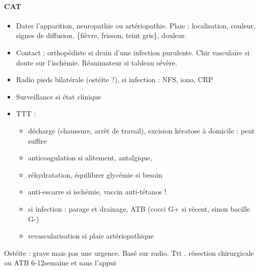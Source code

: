 \documentclass[11pt]{article}
\begin{document}
\paragraph{CAT}
\label{sec:org5c0f980}
\begin{itemize}
\item Dater l'apparition, neuropathie ou artériopathie. Plaie : localisation, couleur,
signes de diffusion, \{fièvre, frisson, teint gris\}, douleur.
\item Contact : orthopédiste si drain d'une infection purulente. Chir vasculaire si
doute sur l'ischémie. Réanimateur si tableau sévère.
\item Radio pieds bilatérale (ostéite ?), si infection : NFS, iono, CRP
\item Surveillance si état clinique
\item TTT : 
\begin{itemize}
\item décharge (chaussure, arrêt de travail), excision kératose à domicile : peut
suffire
\item anticoagulation si alitement, antalgique,
\item réhydratation, équilibrer glycémie si besoin
\item anti-escarre si ischémie, vaccin anti-tétanos !
\item si infection : parage et drainage, ATB (cocci G+ si récent, sinon bacille G-)
\item revascularisation si plaie artériopathique
\end{itemize}
\end{itemize}

Ostéite : grave mais pas une urgence. Basé sur radio. Ttt . résection
chirurgicale ou ATB 6-12semaine et sans l'appui
\end{document}
